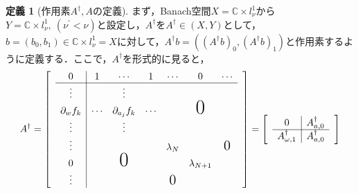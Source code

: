 \documentclass[11pt,a4paper]{jsarticle}
\theoremstyle{definition}
\newtheorem{dfn}{定義}
\begin{document}
\begin{dfn}[作用素$A^\dagger,A$の定義]
  まず，Banach空間$X=\mathbb{C}\times l_\nu^1$から$Y=\mathbb{C}\times l_\nu^1,\ (\nu^\prime<\nu)$と設定し，$A^\dagger$を$A^\dagger\in (X,Y)$として，$b=(b_0,b_1)\in \mathbb{C}\times l_\nu^1=X$に対して，$A^\dagger b=\left(\left(A^\dagger b\right)_0,\left(A^\dagger b\right)_1\right)$と作用素するように定義する．ここで，$A^\dagger$を形式的に見ると，
  \begin{equation*}
    A^\dagger =
    \begin{bmatrix}
       & \multicolumn{1}{c|}{0}              & 1      & \cdots            & 1      & \cdots           & 0               & \cdots           & \\ \cline{2-8}
       & \multicolumn{1}{c|}{\vdots}         &        & \vdots            &        &                  &                 &                  & \\
       & \multicolumn{1}{c|}{\partial_w f_k} & \cdots & \partial_{a_j}f_k & \cdots &                  & \text{\huge{0}} &                    \\
       & \multicolumn{1}{c|}{\vdots}         &        & \vdots            &        &                  &                 &                    \\
       & \multicolumn{1}{c|}{\vdots}         &        &                   &        & \lambda_N        &                 & \text{\Large{0}} & \\
       & \multicolumn{1}{c|}{0}              &        & \text{\huge{0}}   &        &                  & \lambda_{N+1}   &                    \\
       & \multicolumn{1}{c|}{\vdots}         &        &                   &        & \text{\Large{0}} &                 &
    \end{bmatrix}
    =
    \begin{bmatrix}
       & \multicolumn{1}{c|}{0}                    & A_{a,0}^\dagger & \\ \cline{2-3}
       & \multicolumn{1}{c|}{A_{\omega,1}^\dagger} & A_{a,0}^\dagger &
    \end{bmatrix}
  \end{equation*}


\end{dfn}
\end{document}
